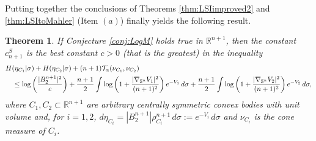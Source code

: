 \documentclass[10pt]{amsart}
\newtheorem{thm}{Theorem}[section]
\theoremstyle{definition}
\theoremstyle{remark}
\newcommand{\R}{\mathbb{R}}
\newcommand{\Sd}{\mathbb{S}}
\begin{document}
Putting together the conclusions of Theorems \ref{thm:LSIimproved2} and \ref{thm:LSItoMahler} (Item $(a)$) finally yields the following result.
\begin{thm}\label{thm:LSIequivMahler}
 If Conjecture \ref{conj:LogM} holds true in $\R^{n+1}$, then the constant $c_{n+1}^S$ is the best constant $c>0$ (that is the greatest) in the inequality
    \begin{align*}
     &H(\eta_{C_1} | \sigma)+ H(\eta_{C_2} | \sigma) + (n+1)\mathcal{T}_\alpha(\nu_{C_1},\nu_{C_2})\\
    &\notag\quad\leq \log \left(\frac{|B_2^{n+1}|^2}{c}\right) + \frac{n+1}{2}\int \log\left(1+ \frac{|\nabla_{\Sd^n}V_1|^2}{(n+1)^2} \right)e^{-V_{1}}\,d\sigma 
    + \frac{n+1}{2}\int \log\left(1+ \frac{|\nabla_{\Sd^n}V_2|^2}{(n+1)^2} \right)e^{-V_{2}}\,d\sigma,
    \end{align*}
    where $C_1,C_2 \subset \R^{n+1}$ are arbitrary centrally symmetric convex bodies with unit volume and, for $i=1,2$, $d\eta_{C_i} = |B_2^{n+1}| \rho_{C_i}^{n+1}\,d\sigma := e^{-V_i}\,d\sigma$ and $\nu_{C_i}$ is the cone measure of $C_i$.
\end{thm}

%
%
\end{document}
